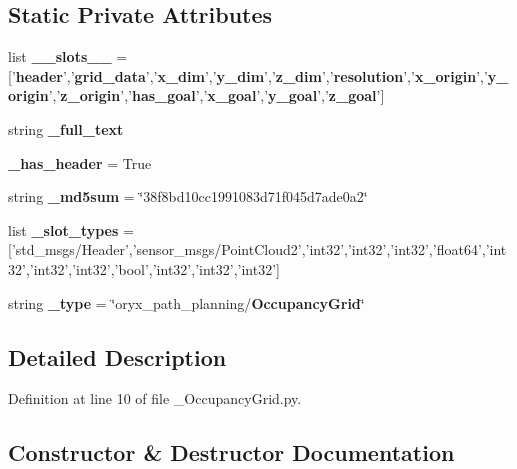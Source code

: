 \subsection*{\-Static \-Private \-Attributes}
\begin{DoxyCompactItemize}
\item 
list {\bf \-\_\-\-\_\-slots\-\_\-\-\_\-} = ['{\bf header}','{\bf grid\-\_\-data}','{\bf x\-\_\-dim}','{\bf y\-\_\-dim}','{\bf z\-\_\-dim}','{\bf resolution}','{\bf x\-\_\-origin}','{\bf y\-\_\-origin}','{\bf z\-\_\-origin}','{\bf has\-\_\-goal}','{\bf x\-\_\-goal}','{\bf y\-\_\-goal}','{\bf z\-\_\-goal}']
\item 
string {\bf \-\_\-full\-\_\-text}
\item 
{\bf \-\_\-has\-\_\-header} = \-True
\item 
string {\bf \-\_\-md5sum} = \char`\"{}38f8bd10cc1991083d71f045d7ade0a2\char`\"{}
\item 
list {\bf \-\_\-slot\-\_\-types} = ['std\-\_\-msgs/\-Header','sensor\-\_\-msgs/\-Point\-Cloud2','int32','int32','int32','float64','int32','int32','int32','bool','int32','int32','int32']
\item 
string {\bf \-\_\-type} = \char`\"{}oryx\-\_\-path\-\_\-planning/{\bf \-Occupancy\-Grid}\char`\"{}
\end{DoxyCompactItemize}


\subsection{\-Detailed \-Description}


\-Definition at line 10 of file \-\_\-\-Occupancy\-Grid.\-py.



\subsection{\-Constructor \& \-Destructor \-Documentation}
